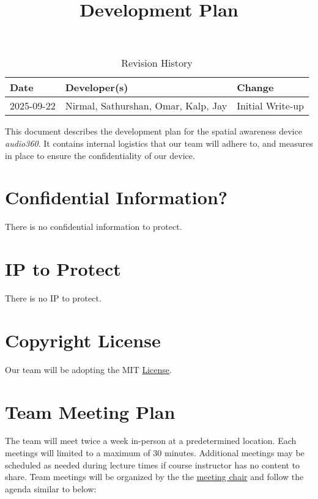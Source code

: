 \documentclass{article}
\title{Development Plan\\\progname}
\author{\authname}
\date{}
\begin{document}
\maketitle

\begin{table}[hp]
\caption{Revision History} \label{TblRevisionHistory}
\begin{tabularx}{\textwidth}{llX}
\toprule
\textbf{Date} & \textbf{Developer(s)} & \textbf{Change}\\
\midrule
2025-09-22 & Nirmal, Sathurshan, Omar, Kalp, Jay & Initial Write-up\\
\bottomrule
\end{tabularx}
\end{table}

\newpage{}

This document describes the development plan for the spatial awareness device
\textit{audio360}. It contains internal logistics that our team will adhere to,
and measures in place to ensure the confidentiality of our device.

\section{Confidential Information?}

There is no confidential information to protect.

\section{IP to Protect}

There is no IP to protect.

\section{Copyright License}

Our team will be adopting the MIT
\href{https://github.com/Nirmal-code/SixSense/blob/main/LICENSE}{License}.

\section{Team Meeting Plan}

The team will meet twice a week in-person at a predetermined location. Each
meetings will limited to a maximum of 30 minutes. Additional meetings may be
scheduled as needed during lecture times if course instructor has no content to
share. Team meetings will be organized by the the
\hyperref[role:meeting_chair]{meeting chair} and follow the agenda similar to
below:
\end{document}

